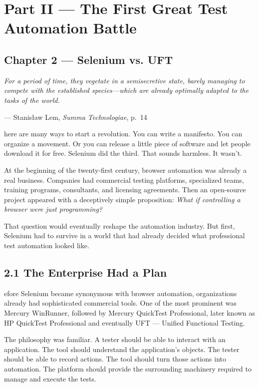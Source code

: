 \documentclass[11pt, a4paper, openany]{book}
\newcommand{\initialcap}[1]{{\fontfamily{lmss}\selectfont\huge\textbf{#1}}}
\providecommand{\epigraphlem}[2]{%
  \begin{flushright}\begin{minipage}{0.72\textwidth}\raggedleft
  \itshape #1\par\vspace{0.4em}\normalfont\small --- #2
  \end{minipage}\end{flushright}\vspace{1.2em}}
\begin{document}
\mainmatter

\chapter*{Part II --- The First Great Test Automation Battle}

\section*{Chapter 2 --- Selenium vs. UFT}

\epigraphlem{For a period of time, they vegetate in a semisecretive state, barely managing to compete with the established species---which are already optimally adapted to the tasks of the world.}{Stanisław Lem, \textit{Summa Technologiae}, p.~14}


\noindent \initialcap{T}here are many ways to start a revolution. You can write a manifesto. You can organize a movement. Or you can release a little piece of software and let people download it for free. Selenium did the third. That sounds harmless. It wasn't.

At the beginning of the twenty-first century, browser automation was already a real business. Companies had commercial testing platforms, specialized teams, training programs, consultants, and licensing agreements. Then an open-source project appeared with a deceptively simple proposition: \textit{What if controlling a browser were just programming?}

That question would eventually reshape the automation industry. But first, Selenium had to survive in a world that had already decided what professional test automation looked like.

\section{2.1 The Enterprise Had a Plan}
\noindent \initialcap{B}efore Selenium became synonymous with browser automation, organizations already had sophisticated commercial tools. One of the most prominent was Mercury WinRunner, followed by Mercury QuickTest Professional, later known as HP QuickTest Professional and eventually UFT --- Unified Functional Testing.

The philosophy was familiar. A tester should be able to interact with an application. The tool should understand the application's objects. The tester should be able to record actions. The tool should turn those actions into automation. The platform should provide the surrounding machinery required to manage and execute the tests.
\end{document}
